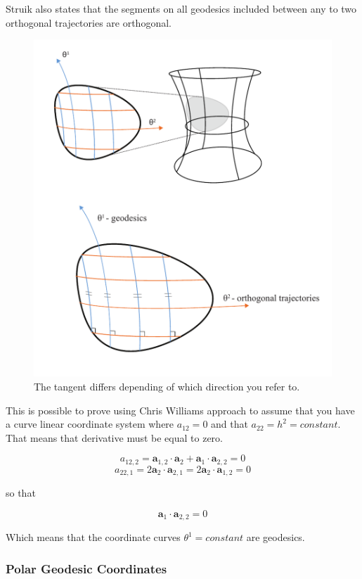 Struik also states that the segments  on all geodesics included  between any to two orthogonal  trajectories are orthogonal.


\begin{figure}[H]
\centering
\includegraphics[height=0.8\linewidth ]{figure/Theory/SurfGeodesics.pdf}
\caption{The tangent differs depending of which direction you refer to. }
\end{figure}

This is possible to prove using Chris Williams approach to assume that you have a curve linear coordinate system where $a_{12} = 0$ and that $a_{22} = h^2 = constant$. That means that derivative must be equal to zero.

\begin{equation}
a_{12,2} = \textbf{a}_{1,2} \cdot \textbf{a}_2 + \textbf{a}_1 \cdot \textbf{a}_{2,2} = 0
\end{equation}
\begin{equation}
a_{22,1} = 2\textbf{a}_{2} \cdot \textbf{a}_{2,1} = 2\textbf{a}_{2} \cdot \textbf{a}_{1,2} = 0
\end{equation}

so that

\begin{equation}
\textbf{a}_1 \cdot \textbf{a}_{2,2} = 0
\end{equation}

Which means that the coordinate curves $\theta^1 = constant$ are geodesics. 


\subsubsection{Polar Geodesic Coordinates}

